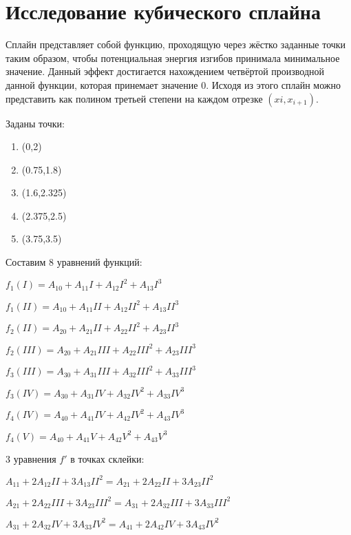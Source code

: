 \documentclass[russian,utf8,nocolumnxxxi,nocolumnxxxii]{eskdtext}
\begin{document}
\section{Исследование кубического сплайна}

Сплайн представляет собой функцию, проходящую через жёстко заданные точки таким образом, чтобы потенциальная энергия изгибов принимала минимальное значение. Данный эффект достигается нахождением четвёртой производной данной функции, которая принемает значение 0. Исходя из этого сплайн можно представить как полином третьей степени на каждом отрезке $(xi,x_{i+1})$.

Заданы точки:
\begin{enumerate}[I]
    \item (0,2)
    \item (0.75,1.8)
    \item (1.6,2.325)
    \item (2.375,2.5)
    \item (3.75,3.5)
\end{enumerate}

Составим 8 уравнений функций:
\begin{center}

$f_1(I)=A_{10}+A_{11}I+A_{12}I^2+A_{13}I^3$

$f_1(II)=A_{10}+A_{11}II+A_{12}II^2+A_{13}II^3$

$f_2(II)=A_{20}+A_{21}II+A_{22}II^2+A_{23}II^3$

$f_2(III)=A_{20}+A_{21}III+A_{22}III^2+A_{23}III^3$

$f_3(III)=A_{30}+A_{31}III+A_{32}III^2+A_{33}III^3$

$f_3(IV)=A_{30}+A_{31}IV+A_{32}IV^2+A_{33}IV^3$

$f_4(IV)=A_{40}+A_{41}IV+A_{42}IV^2+A_{43}IV^3$

$f_4(V)=A_{40}+A_{41}V+A_{42}V^2+A_{43}V^3$

\end{center}

3 уравнения $f'$ в точках склейки:

\begin{center}
    
$A_{11}+2A_{12}II+3A_{13}II^2=A_{21}+2A_{22}II+3A_{23}II^2$

$A_{21}+2A_{22}III+3A_{23}III^2=A_{31}+2A_{32}III+3A_{33}III^2$

$A_{31}+2A_{32}IV+3A_{33}IV^2=A_{41}+2A_{42}IV+3A_{43}IV^2$
    
\end{center}
\end{document}
